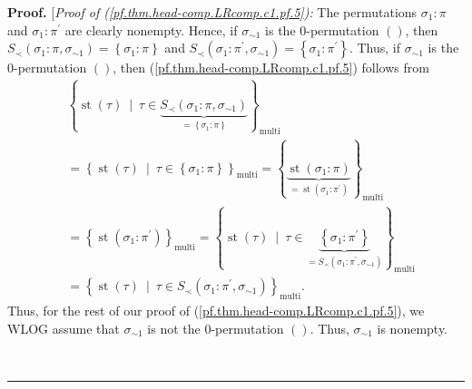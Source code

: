 \documentclass[numbers=enddot,12pt,final,onecolumn,notitlepage]{scrartcl}%
\theoremstyle{definition}
\newenvironment{proof}[1][Proof]{\noindent\textbf{#1.} }{\ \rule{0.5em}{0.5em}}
\begin{document}
\begin{proof}
[\textit{Proof of (\ref{pf.thm.head-comp.LRcomp.c1.pf.5}):} The permutations
$\sigma_{1}:\pi$ and $\sigma_{1}:\pi^{\prime}$ are clearly nonempty. Hence, if
$\sigma_{\sim1}$ is the $0$-permutation $\left(  {}\right)  $, then
$S_{\prec}\left(  \sigma_{1}:\pi,\sigma_{\sim1}\right)  =\left\{  \sigma
_{1}:\pi\right\}  $ and $S_{\prec}\left(  \sigma_{1}:\pi^{\prime},\sigma
_{\sim1}\right)  =\left\{  \sigma_{1}:\pi^{\prime}\right\}  $. Thus, if
$\sigma_{\sim1}$ is the $0$-permutation $\left(  {}\right)  $, then
(\ref{pf.thm.head-comp.LRcomp.c1.pf.5}) follows from%
\begin{align*}
&  \left\{  \operatorname*{st}\left(  \tau\right)  \ \mid\ \tau\in
\underbrace{S_{\prec}\left(  \sigma_{1}:\pi,\sigma_{\sim1}\right)
}_{=\left\{  \sigma_{1}:\pi\right\}  }\right\}  _{\operatorname*{multi}}\\
&  =\left\{  \operatorname*{st}\left(  \tau\right)  \ \mid\ \tau\in\left\{
\sigma_{1}:\pi\right\}  \right\}  _{\operatorname*{multi}}=\left\{
\underbrace{\operatorname*{st}\left(  \sigma_{1}:\pi\right)  }%
_{=\operatorname*{st}\left(  \sigma_{1}:\pi^{\prime}\right)  }\right\}
_{\operatorname*{multi}}\\
&  =\left\{  \operatorname*{st}\left(  \sigma_{1}:\pi^{\prime}\right)
\right\}  _{\operatorname*{multi}}=\left\{  \operatorname*{st}\left(
\tau\right)  \ \mid\ \tau\in\underbrace{\left\{  \sigma_{1}:\pi^{\prime
}\right\}  }_{=S_{\prec}\left(  \sigma_{1}:\pi^{\prime},\sigma_{\sim1}\right)
}\right\}  _{\operatorname*{multi}}\\
&  =\left\{  \operatorname*{st}\left(  \tau\right)  \ \mid\ \tau\in S_{\prec
}\left(  \sigma_{1}:\pi^{\prime},\sigma_{\sim1}\right)  \right\}
_{\operatorname*{multi}}.
\end{align*}
Thus, for the rest of our proof of (\ref{pf.thm.head-comp.LRcomp.c1.pf.5}), we
WLOG assume that $\sigma_{\sim1}$ is not the $0$-permutation $\left(
{}\right)  $. Thus, $\sigma_{\sim1}$ is nonempty.


\end{proof}
\end{document}
